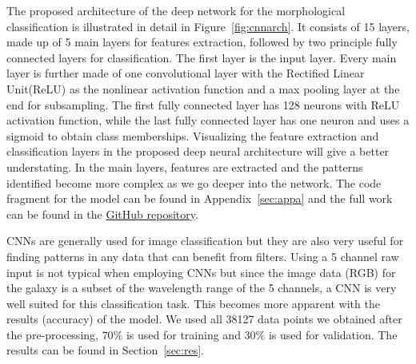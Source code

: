 The proposed architecture of the deep network for the morphological classification is illustrated in detail in Figure~\ref{fig:cnnarch}. It consists of 15 layers, made up of 5 main layers for features extraction, followed by two principle fully connected layers for classification. The first layer is the input layer. Every main layer is further made of one convolutional layer with the Rectified Linear Unit(ReLU) as the nonlinear activation function and a max pooling layer at the end for subsampling. The first fully connected layer has 128 neurons with ReLU activation function, while the last fully connected layer has one neuron and uses a sigmoid to obtain class memberships. Visualizing the feature extraction and classification layers in the proposed deep neural architecture will give a better understating. In the main layers, features are extracted and the patterns identified become more complex as we go deeper into the network. The code fragment for the model can be found in Appendix~\ref{sec:appa} and the full work can be found in the \href{https://github.com/klaykulik/datascience}{GitHub repository}.

CNNs are generally used for image classification but they are also very useful for finding patterns in any data that can benefit from filters. Using a 5 channel raw input is not typical when employing CNNs but since the image data (RGB) for the galaxy is a subset of the wavelength range of the 5 channels, a CNN is very well suited for this classification task. This becomes more apparent with the results (accuracy) of the model. We used all 38127 data points we obtained after the pre-processing, $70\%$ is used for training and $30\%$ is used for validation. The results can be found in Section~\ref{sec:res}.